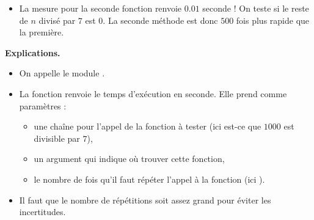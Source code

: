 \documentclass[11pt,class=report,crop=false]{standalone}
\begin{document}
\begin{cours}
\begin{itemize}
  \item La mesure pour la seconde fonction renvoie $0.01$ seconde ! On teste si le reste de $n$ divisé par $7$ est $0$. La seconde méthode est donc $500$ fois plus rapide que la première.
\end{itemize}  

\medskip

\textbf{Explications.}
\begin{itemize}
  \item On appelle le module .
    
  \item La fonction  renvoie le temps d'exécution en seconde.
Elle prend comme paramètres : 
  \begin{itemize}
    \item une chaîne pour l'appel de la fonction à tester (ici est-ce que $1000$ est divisible par $7$),
    \item un argument  qui indique où trouver cette fonction,
    \item le nombre de fois qu'il faut répéter l'appel à la fonction (ici ).
  \end{itemize}
  \item Il faut que le nombre de répétitions soit assez grand pour éviter les incertitudes.
\end{itemize} 

\end{cours}


\end{document}
